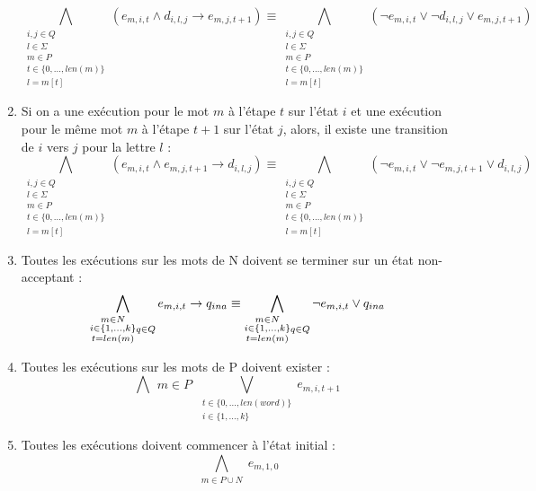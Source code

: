 \documentclass[a4paper, 12pt]{extarticle}
\begin{document}
\begin{enumerate}
\begin{equation*}
        \bigwedge_{\substack{i,j \in Q\\l \in \Sigma\\m \in P\\t \in \{0,\dots,len(m)\}\\l=m[t]}} (e_{m,i,t} \wedge d_{i,l,j} \rightarrow e_{m,j,t+1}) \equiv
        \bigwedge_{\substack{i,j \in Q\\l \in \Sigma\\m \in P\\t \in \{0,\dots,len(m)\}\\l=m[t]}} (\neg e_{m,i,t} \vee \neg d_{i,l,j} \vee e_{m,j,t+1})
    \end{equation*}
    \item Si on a une exécution pour le mot $m$ à l'étape $t$ sur l'état $i$ et une exécution pour le même mot $m$ à l'étape $t+1$ sur l'état $j$,
    alors, il existe une transition de $i$ vers $j$ pour la lettre $l$ :
    \begin{equation*}
        \bigwedge_{\substack{i,j \in Q\\l \in \Sigma\\m \in P\\t \in \{0,\dots,len(m)\}\\l=m[t]}} (e_{m,i,t} \wedge e_{m,j,t+1} \rightarrow d_{i,l,j})\equiv
        \bigwedge_{\substack{i,j \in Q\\l \in \Sigma\\m \in P\\t \in \{0,\dots,len(m)\}\\l=m[t]}} (\neg e_{m,i,t} \vee \neg e_{m,j,t+1} \vee d_{i,l,j})
    \end{equation*}
    \item Toutes les exécutions sur les mots de N doivent se terminer sur un état non-acceptant :
    \begin{equation*}
        \bigwedge_{\substack{m \in N\\i \in \{1,\dots,k\}\\t=len(m)}\\q\in Q} e_{m,i,t} \rightarrow q_{ina}\equiv
        \bigwedge_{\substack{m \in N\\i \in \{1,\dots,k\}\\t=len(m)}\\q\in Q} \neg e_{m,i,t} \vee q_{ina}
    \end{equation*}
    \item Toutes les exécutions sur les mots de P doivent exister :
    \begin{equation*}
        \bigwedge{\substack{m\in P}}\bigvee_{\substack{t\in\{0,\dots,len(word)\}\\i\in \{1,\dots,k\}}} e_{m,i,t+1}
    \end{equation*}
    \item Toutes les exécutions doivent commencer à l'état initial :
    \begin{equation*}
        \bigwedge_{\substack{m\in P\cup N}} e_{m,1,0}
    \end{equation*}
\end{enumerate}
\end{document}
